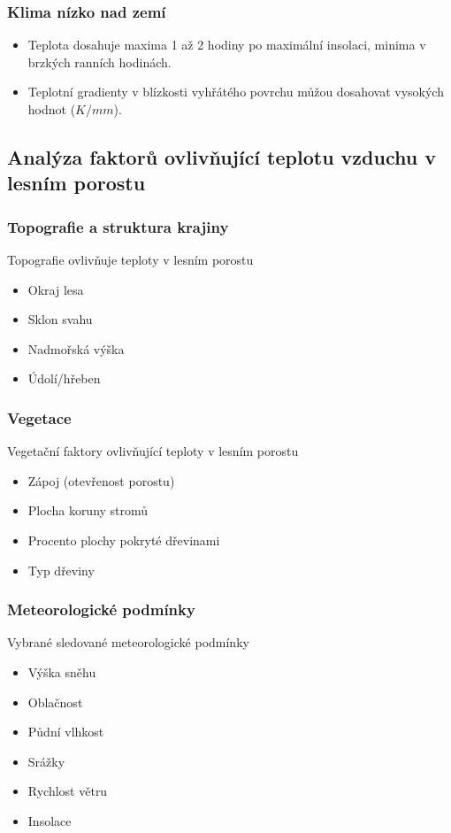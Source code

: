 \documentclass[
	11pt, %
]{beamer}
\begin{document}
\begin{frame}
	\frametitle{Klima nízko nad zemí}
	\begin{itemize}
		\item Teplota dosahuje maxima 1 až 2 hodiny po maximální insolaci, minima v brzkých ranních hodinách.
		\item Teplotní gradienty v blízkosti vyhřátého povrchu můžou dosahovat vysokých hodnot ($\si{}{K/mm}$).
	\end{itemize}
\end{frame}

\subsection{Analýza faktorů ovlivňující teplotu vzduchu v lesním porostu}

\begin{frame}
	\frametitle{Topografie a struktura krajiny}
	Topografie ovlivňuje teploty v lesním porostu
	\begin{itemize}
		\item Okraj lesa
		\item Sklon svahu
		\item Nadmořská výška
		\item Údolí/hřeben
	\end{itemize}
\end{frame}

\begin{frame}
	\frametitle{Vegetace}
	Vegetační faktory ovlivňující teploty v lesním porostu
	\begin{itemize}
		\item Zápoj (otevřenost porostu)
		\item Plocha koruny stromů
		\item Procento plochy pokryté dřevinami
		\item Typ dřeviny
	\end{itemize}
\end{frame}

\begin{frame}
	\frametitle{Meteorologické podmínky}
	Vybrané sledované meteorologické podmínky
	\begin{itemize}
		\item Výška sněhu
		\item Oblačnost
		\item Půdní vlhkost
		\item Srážky
		\item Rychlost větru
		\item Insolace
	\end{itemize}
\end{frame}
\end{document}
